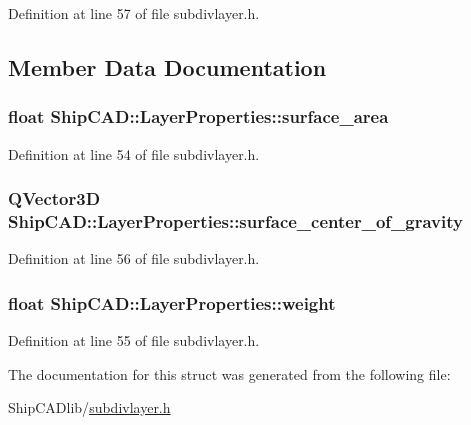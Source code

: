 Definition at line 57 of file subdivlayer.\-h.



\subsection{Member Data Documentation}
\hypertarget{structShipCAD_1_1LayerProperties_aff6dab68937efc1abd7bb5066373f514}{
\subsubsection[{surface\-\_\-area}]{\setlength{\rightskip}{0pt plus 5cm}float Ship\-C\-A\-D\-::\-Layer\-Properties\-::surface\-\_\-area}}\label{structShipCAD_1_1LayerProperties_aff6dab68937efc1abd7bb5066373f514}


Definition at line 54 of file subdivlayer.\-h.

\hypertarget{structShipCAD_1_1LayerProperties_a1b4bc8254c8cb90df594bc7905ce3e22}{
\subsubsection[{surface\-\_\-center\-\_\-of\-\_\-gravity}]{\setlength{\rightskip}{0pt plus 5cm}Q\-Vector3\-D Ship\-C\-A\-D\-::\-Layer\-Properties\-::surface\-\_\-center\-\_\-of\-\_\-gravity}}\label{structShipCAD_1_1LayerProperties_a1b4bc8254c8cb90df594bc7905ce3e22}


Definition at line 56 of file subdivlayer.\-h.

\hypertarget{structShipCAD_1_1LayerProperties_a4e9844dd95994725401ad93c5c3a00e9}{
\subsubsection[{weight}]{\setlength{\rightskip}{0pt plus 5cm}float Ship\-C\-A\-D\-::\-Layer\-Properties\-::weight}}\label{structShipCAD_1_1LayerProperties_a4e9844dd95994725401ad93c5c3a00e9}


Definition at line 55 of file subdivlayer.\-h.



The documentation for this struct was generated from the following file\-:\begin{DoxyCompactItemize}
\item 
Ship\-C\-A\-Dlib/\hyperlink{subdivlayer_8h}{subdivlayer.\-h}\end{DoxyCompactItemize}
